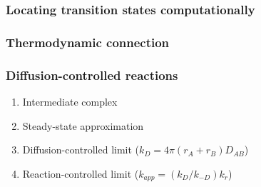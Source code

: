 \documentclass[11pt]{article}
\begin{document}
\subsubsection{Locating transition states computationally}
\label{sec:org562ceeb}
\subsubsection{Thermodynamic connection}
\label{sec:org2467591}
\subsubsection{Diffusion-controlled reactions}
\label{sec:org610eb3a}
\begin{enumerate}
\item Intermediate complex
\item Steady-state approximation
\item Diffusion-controlled limit (\(k_D = 4\pi (r_A + r_B) D_{AB}\))
\item Reaction-controlled limit (\(k_{app}=(k_D/k_{-D})k_r\))
\end{enumerate}
\end{document}
